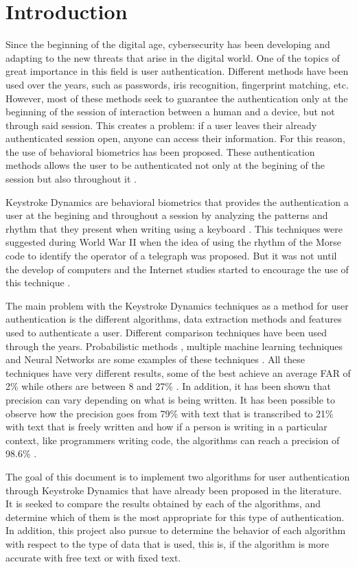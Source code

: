 \section{Introduction}

Since the beginning of the digital age, cybersecurity has been developing and adapting to the new threats that arise in the digital world. One of the topics of great importance in this field is user authentication. Different methods have been used over the years, such as passwords, iris recognition, fingerprint matching, etc. However, most of these methods seek to guarantee the authentication only at the beginning of the session of interaction between a human and a device, but not through said session. This creates a problem: if a user leaves their already authenticated session open, anyone can access their information. For this reason, the use of behavioral biometrics has been proposed. These authentication methods allows the user to be authenticated not only at the begining of the session but also throughout it \cite{behavior}.

Keystroke Dynamics are behavioral biometrics that provides the authentication a user at the begining and throughout a session by analyzing the patterns and rhythm that they present when writing using a keyboard \cite{combine_distance}. This techniques were suggested during World War II \cite{secondworldwar} when the idea of using the rhythm of the Morse code to identify the operator of a telegraph was proposed. But it was not until the develop of computers and the Internet studies started to encourage the use of this technique \cite{monrose2000keystroke}.


The main problem with the Keystroke Dynamics techniques as a method for user authentication is the different algorithms, data extraction methods and features used to authenticate a user. Different comparison techniques have been used through the years. Probabilistic methods \cite{bleha1990login}, multiple machine learning techniques \cite{machine_learning} and Neural Networks are some examples of these techniques \cite{pnn, deep_learning}. All these techniques have very different results, some of the best achieve an average FAR of 2\% while others are between 8 and 27\% \cite{typing_patterns}. In addition, it has been shown that precision can vary depending on what is being written. It has been possible to observe how the precision goes from 79\% with text that is transcribed to 21\% with text that is freely written \cite{old} and how if a person is writing in a particular context, like programmers writing code, the algorithms can reach a precision of 98.6\% \cite{programmers}.

The goal of this document is to implement two algorithms for user authentication through Keystroke Dynamics that have already been proposed in the literature. It is seeked to compare the results obtained by each of the algorithms, and determine which of them is the most appropriate for this type of authentication. In addition, this project also pursue to determine the behavior of each algorithm with respect to the type of data that is used, this is, if the algorithm is more accurate with free text or with fixed text.